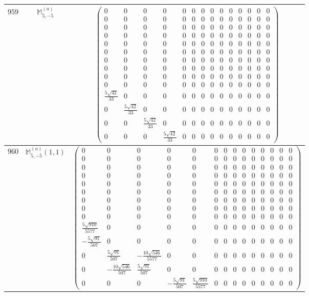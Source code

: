 \documentclass[fleqn,8pt,landscape]{jsarticle}
\begin{document}
\begin{center}
\begin{longtable}{ccc}
$ 959 $ & $ \mathbb{M}_{5,-5}^{(a)} $ & $ \begin{pmatrix} 0 & 0 & 0 & 0 & 0 & 0 & 0 & 0 & 0 & 0 & 0 & 0 & 0 & 0 \\ 0 & 0 & 0 & 0 & 0 & 0 & 0 & 0 & 0 & 0 & 0 & 0 & 0 & 0 \\ 0 & 0 & 0 & 0 & 0 & 0 & 0 & 0 & 0 & 0 & 0 & 0 & 0 & 0 \\ 0 & 0 & 0 & 0 & 0 & 0 & 0 & 0 & 0 & 0 & 0 & 0 & 0 & 0 \\ 0 & 0 & 0 & 0 & 0 & 0 & 0 & 0 & 0 & 0 & 0 & 0 & 0 & 0 \\ 0 & 0 & 0 & 0 & 0 & 0 & 0 & 0 & 0 & 0 & 0 & 0 & 0 & 0 \\ 0 & 0 & 0 & 0 & 0 & 0 & 0 & 0 & 0 & 0 & 0 & 0 & 0 & 0 \\ 0 & 0 & 0 & 0 & 0 & 0 & 0 & 0 & 0 & 0 & 0 & 0 & 0 & 0 \\ 0 & 0 & 0 & 0 & 0 & 0 & 0 & 0 & 0 & 0 & 0 & 0 & 0 & 0 \\ 0 & 0 & 0 & 0 & 0 & 0 & 0 & 0 & 0 & 0 & 0 & 0 & 0 & 0 \\ \frac{5 \sqrt{42}}{33} & 0 & 0 & 0 & 0 & 0 & 0 & 0 & 0 & 0 & 0 & 0 & 0 & 0 \\ 0 & \frac{5 \sqrt{42}}{33} & 0 & 0 & 0 & 0 & 0 & 0 & 0 & 0 & 0 & 0 & 0 & 0 \\ 0 & 0 & \frac{5 \sqrt{42}}{33} & 0 & 0 & 0 & 0 & 0 & 0 & 0 & 0 & 0 & 0 & 0 \\ 0 & 0 & 0 & \frac{5 \sqrt{42}}{33} & 0 & 0 & 0 & 0 & 0 & 0 & 0 & 0 & 0 & 0 \end{pmatrix} $ \\ \hline
$ 960 $ & $ \mathbb{M}_{5,-5}^{(a)}(1,1) $ & $ \begin{pmatrix} 0 & 0 & 0 & 0 & 0 & 0 & 0 & 0 & 0 & 0 & 0 & 0 & 0 & 0 \\ 0 & 0 & 0 & 0 & 0 & 0 & 0 & 0 & 0 & 0 & 0 & 0 & 0 & 0 \\ 0 & 0 & 0 & 0 & 0 & 0 & 0 & 0 & 0 & 0 & 0 & 0 & 0 & 0 \\ 0 & 0 & 0 & 0 & 0 & 0 & 0 & 0 & 0 & 0 & 0 & 0 & 0 & 0 \\ 0 & 0 & 0 & 0 & 0 & 0 & 0 & 0 & 0 & 0 & 0 & 0 & 0 & 0 \\ 0 & 0 & 0 & 0 & 0 & 0 & 0 & 0 & 0 & 0 & 0 & 0 & 0 & 0 \\ 0 & 0 & 0 & 0 & 0 & 0 & 0 & 0 & 0 & 0 & 0 & 0 & 0 & 0 \\ 0 & 0 & 0 & 0 & 0 & 0 & 0 & 0 & 0 & 0 & 0 & 0 & 0 & 0 \\ 0 & 0 & 0 & 0 & 0 & 0 & 0 & 0 & 0 & 0 & 0 & 0 & 0 & 0 \\ \frac{5 \sqrt{910}}{5577} & 0 & 0 & 0 & 0 & 0 & 0 & 0 & 0 & 0 & 0 & 0 & 0 & 0 \\ - \frac{5 \sqrt{91}}{507} & 0 & 0 & 0 & 0 & 0 & 0 & 0 & 0 & 0 & 0 & 0 & 0 & 0 \\ 0 & \frac{5 \sqrt{91}}{507} & - \frac{10 \sqrt{546}}{5577} & 0 & 0 & 0 & 0 & 0 & 0 & 0 & 0 & 0 & 0 & 0 \\ 0 & - \frac{10 \sqrt{546}}{507} & \frac{5 \sqrt{91}}{507} & 0 & 0 & 0 & 0 & 0 & 0 & 0 & 0 & 0 & 0 & 0 \\ 0 & 0 & 0 & - \frac{5 \sqrt{91}}{507} & \frac{5 \sqrt{910}}{5577} & 0 & 0 & 0 & 0 & 0 & 0 & 0 & 0 & 0 \end{pmatrix} $ \\ \hline

\end{longtable}
\end{center}
\end{document}

